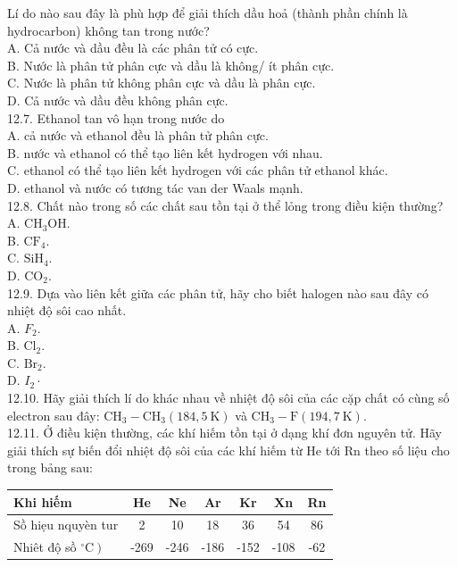 \documentclass[10pt]{article}
\begin{document}
Lí do nào sau đây là phù hợp để giải thích dầu hoả (thành phần chính là hydrocarbon) không tan trong nước?\\
A. Cả nước và dầu đều là các phân tử có cực.\\
B. Nước là phân tử phân cực và dầu là không/ ít phân cực.\\
C. Nước là phân tử không phân cực và dầu là phân cực.\\
D. Cả nước và dầu đều không phân cực.\\
12.7. Ethanol tan vô hạn trong nước do\\
A. cả nước và ethanol đều là phân tử phân cực.\\
B. nước và ethanol có thể tạo liên kết hydrogen với nhau.\\
C. ethanol có thể tạo liên kết hydrogen với các phân tử ethanol khác.\\
D. ethanol và nước có tương tác van der Waals mạnh.\\
12.8. Chất nào trong số các chất sau tồn tại ở thể lỏng trong điều kiện thường?\\
A. $\mathrm{CH}_{3} \mathrm{OH}$.\\
B. $\mathrm{CF}_{4}$.\\
C. $\mathrm{SiH}_{4}$.\\
D. $\mathrm{CO}_{2}$.\\
12.9. Dựa vào liên kết giữa các phân tử, hãy cho biết halogen nào sau đây có nhiệt độ sôi cao nhất.\\
A. $F_{2}$.\\
B. $\mathrm{Cl}_{2}$.\\
C. $\mathrm{Br}_{2}$.\\
D. $I_{2} \cdot$\\
12.10. Hãy giải thích lí do khác nhau về nhiệt độ sôi của các cặp chất có cùng số electron sau đây: $\mathrm{CH}_{3}-\mathrm{CH}_{3}(184,5 \mathrm{~K})$ và $\mathrm{CH}_{3}-\mathrm{F}(194,7 \mathrm{~K})$.\\
12.11. Ở điều kiện thường, các khí hiếm tồn tại ở dạng khí đơn nguyên tử. Hãy giải thích sự biến đổi nhiệt độ sôi của các khí hiếm từ He tới Rn theo số liệu cho trong bảng sau:

\begin{center}
\begin{tabular}{|l|c|c|c|c|c|c|}
\hline
Khi hiếm & He & Ne & Ar & Kr & Xn & Rn \\
\hline
Sồ hiẹu nquyèn tur & 2 & 10 & 18 & 36 & 54 & 86 \\
\hline
Nhiêt độ sồ $\left.{ }^{\circ} \mathrm{C}\right)$ & -269 & -246 & -186 & -152 & -108 & -62 \\
\hline
\end{tabular}
\end{center}
\end{document}
